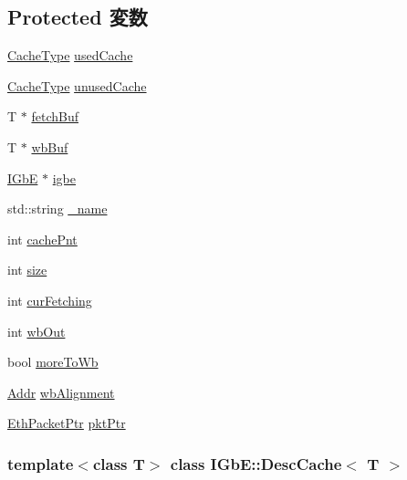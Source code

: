 \subsection*{Protected 変数}
\begin{DoxyCompactItemize}
\item 
\hyperlink{classstd_1_1deque}{CacheType} \hyperlink{classIGbE_1_1DescCache_a99982ada48f129fedf0ee5d8871f5df8}{usedCache}
\item 
\hyperlink{classstd_1_1deque}{CacheType} \hyperlink{classIGbE_1_1DescCache_af60e49173ff6f145cb02253c92201694}{unusedCache}
\item 
T $\ast$ \hyperlink{classIGbE_1_1DescCache_a45bfe33ba83d15f61fe3f115d779717e}{fetchBuf}
\item 
T $\ast$ \hyperlink{classIGbE_1_1DescCache_a48d72919f0a5e868ed72f1b9f995e294}{wbBuf}
\item 
\hyperlink{classIGbE}{IGbE} $\ast$ \hyperlink{classIGbE_1_1DescCache_a408e72fda9473efd272ef36a9f6d6928}{igbe}
\item 
std::string \hyperlink{classIGbE_1_1DescCache_aaf2ed934b37cbbd236fdd1b01a5f5005}{\_\-name}
\item 
int \hyperlink{classIGbE_1_1DescCache_ae61bf30eb8cd19a999687fc3b471f778}{cachePnt}
\item 
int \hyperlink{classIGbE_1_1DescCache_a439227feff9d7f55384e8780cfc2eb82}{size}
\item 
int \hyperlink{classIGbE_1_1DescCache_adf659db1aecba7384fa82d960d89d602}{curFetching}
\item 
int \hyperlink{classIGbE_1_1DescCache_a40ac490f16b3b0f977f34621d2b8c550}{wbOut}
\item 
bool \hyperlink{classIGbE_1_1DescCache_adf55798327cfefd75a5db0a6e71009e6}{moreToWb}
\item 
\hyperlink{base_2types_8hh_af1bb03d6a4ee096394a6749f0a169232}{Addr} \hyperlink{classIGbE_1_1DescCache_aeb55673ae3c17ae211ad114c823bf761}{wbAlignment}
\item 
\hyperlink{classRefCountingPtr}{EthPacketPtr} \hyperlink{classIGbE_1_1DescCache_a3ac80d9129084f8cd11a49ded80e8333}{pktPtr}
\end{DoxyCompactItemize}
\subsubsection*{template$<$class T$>$ class IGbE::DescCache$<$ T $>$}



